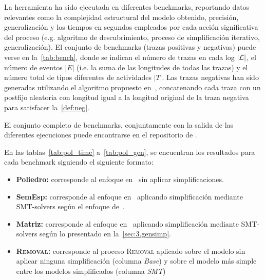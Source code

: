 La herramienta ha sido ejecutada en diferentes benckmarks, reportando datos relevantes como la 
complejidad estructural del modelo obtenido, precisión, generalización y los tiempos en segundos 
empleados por cada acción significativa del proceso (e.g. algoritmo de descubrimiento,
proceso de simplificación iterativo, generalización).
El conjunto de benchmarks (trazas positivas y negativas) puede verse en la~\autoref{tab:bench}, donde se
indican el número de trazas en cada log $|{\mathcal L}|$, el número de eventos $|E|$ (i.e. la suma de las 
longitudes de todas las trazas) y el número total de tipos diferentes de actividades $|T|$.
Las trazas negativas han sido generadas utilizando el algoritmo propuesto en~\cite{BrouckeWVB14},
concatenando cada traza con un postfijo aleatoria con longitud igual a la longitud original de la traza
negativa para satisfacer la~\autoref{def:neg}.

El conjunto completo de benchmarks, conjuntamente con la salida de las diferentes ejecuciones puede 
encontrarse en el repositorio de \pachtool.

En las tablas~\ref{tab:pol_time} a~\ref{tab:pol_gen}, se encuentran los resultados para cada benchmark siguiendo
el siguiente formato:

\begin{itemize}
    \item \textbf{Poliedro:} corresponde al enfoque en~\cite{CarmonaC14} sin aplicar simplificaciones.
    \item \textbf{SemEsp:} corresponde al enfoque en~\cite{CarmonaC14} aplicando simplificación mediante SMT-solvers según el enfoque de~\cite{LeonCB15}.
    \item \textbf{Matriz:} corresponde al enfoque en~\cite{CarmonaC14} aplicando simplificación mediante SMT-solvers según lo 
      presentado en la~\autoref{sec:3.gensimp}.
    \item \textbf{\textsc{Removal}:} corresponde al proceso \textsc{Removal} aplicado sobre el modelo
        sin aplicar ninguna simplificación (columna \textit{Base}) y sobre el modelo más simple entre
        los modelos simplificados (columna \textit{SMT})
\end{itemize}


